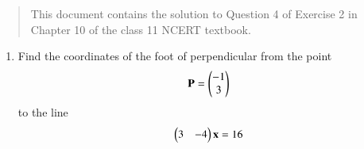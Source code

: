 \documentclass[journal,12pt,twocolumn]{IEEEtran}
\begin{document}
\begin{abstract}
    This document contains the solution to Question 4 of Exercise 2 in Chapter
    10 of the class 11 NCERT textbook.
\end{abstract}

\begin{enumerate}
    \item Find the coordinates of the foot of perpendicular from the point 
    \begin{align}
        \mathbf{P} = \begin{pmatrix}-1\\3\end{pmatrix}
        \label{eq:P-def}
    \end{align}
    to the line 
    \begin{align}
        \begin{pmatrix}3&-4\end{pmatrix}\mathbf{x} = 16
        \label{eq:line}
    \end{align}


\end{enumerate}
\end{document}
